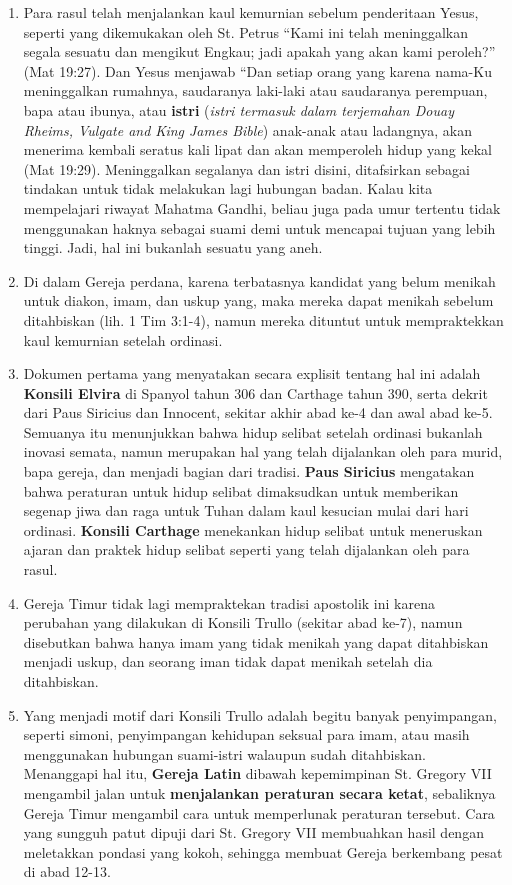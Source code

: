 \begin{enumerate}
\item    Para rasul telah menjalankan kaul kemurnian sebelum penderitaan Yesus, seperti yang dikemukakan oleh St. Petrus “Kami ini telah meninggalkan segala sesuatu dan mengikut Engkau; jadi apakah yang akan kami peroleh?” (Mat 19:27). Dan Yesus menjawab “Dan setiap orang yang karena nama-Ku meninggalkan rumahnya, saudaranya laki-laki atau saudaranya perempuan, bapa atau ibunya, atau \textbf{istri} (\textit{istri termasuk dalam terjemahan Douay Rheims, Vulgate and King James Bible}) anak-anak atau ladangnya, akan menerima kembali seratus kali lipat dan akan memperoleh hidup yang kekal (Mat 19:29). Meninggalkan segalanya dan istri disini, ditafsirkan sebagai tindakan untuk tidak melakukan lagi hubungan badan. Kalau kita mempelajari riwayat Mahatma Gandhi, beliau juga pada umur tertentu tidak menggunakan haknya sebagai suami demi untuk mencapai tujuan yang lebih tinggi. Jadi, hal ini bukanlah sesuatu yang aneh.
\item Di dalam Gereja perdana, karena terbatasnya kandidat yang belum menikah untuk diakon, imam, dan uskup yang, maka mereka dapat menikah sebelum ditahbiskan (lih. 1 Tim 3:1-4), namun mereka dituntut untuk mempraktekkan kaul kemurnian setelah ordinasi.
\item Dokumen pertama yang menyatakan secara explisit tentang hal ini adalah \textbf{Konsili Elvira} di Spanyol tahun 306 dan Carthage tahun 390, serta dekrit dari Paus Siricius dan Innocent, sekitar akhir abad ke-4 dan awal abad ke-5. Semuanya itu menunjukkan bahwa hidup selibat setelah ordinasi bukanlah inovasi semata, namun merupakan hal yang telah dijalankan oleh para murid, bapa gereja, dan menjadi bagian dari tradisi. \textbf{Paus Siricius} mengatakan bahwa peraturan untuk hidup selibat dimaksudkan untuk memberikan segenap jiwa dan raga untuk Tuhan dalam kaul kesucian mulai dari hari ordinasi. \textbf{Konsili Carthage} menekankan hidup selibat untuk meneruskan ajaran dan praktek hidup selibat seperti yang telah dijalankan oleh para rasul.
\item Gereja Timur tidak lagi mempraktekan tradisi apostolik ini karena perubahan yang dilakukan di Konsili Trullo (sekitar abad ke-7), namun disebutkan bahwa hanya imam yang tidak menikah yang dapat ditahbiskan menjadi uskup, dan seorang iman tidak dapat menikah setelah dia ditahbiskan.
\item Yang menjadi motif dari Konsili Trullo adalah begitu banyak penyimpangan, seperti simoni, penyimpangan kehidupan seksual para imam, atau masih menggunakan hubungan suami-istri walaupun sudah ditahbiskan. Menanggapi hal itu, \textbf{Gereja Latin} dibawah kepemimpinan St. Gregory VII mengambil jalan untuk \textbf{menjalankan peraturan secara ketat}, sebaliknya Gereja Timur mengambil cara untuk memperlunak peraturan tersebut. Cara yang sungguh patut dipuji dari St. Gregory VII membuahkan hasil dengan meletakkan pondasi yang kokoh, sehingga membuat Gereja berkembang pesat di abad 12-13.

\end{enumerate}
